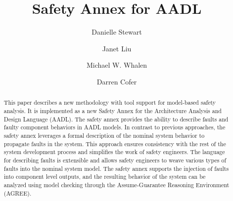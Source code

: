 \documentclass{llncs}
\begin{document}
\newcommand{\stateequiv}{\equiv_{s}}
\newcommand{\traceequiv}{\equiv_{\sigma}}
\newcommand{\ta}{\text{TA}}
\newcommand{\cta}{\text{TA$_{C}$}}
\newcommand{\tta}{\text{TA$_{T}$}}
\newcommand{\ucalg}{\texttt{\small{IVC\_UC}}}
\newcommand{\ucbfalg}{\texttt{\small{IVC\_UCBF}}}


\title{Safety Annex for AADL}
%
\author{Danielle Stewart
\and Janet Liu
\and Michael W. Whalen
\and Darren Cofer }
\maketitle

\begin{abstract}
This paper describes a new methodology with tool support for model-based safety analysis. It is implemented as a new Safety Annex for the Architecture Analysis and Design Language (AADL). The safety annex provides the ability to describe faults and faulty component behaviors in AADL models. In contrast to previous approaches, the safety annex leverages a formal description of the nominal system behavior to propagate faults in the system. This approach ensures consistency with the rest of the system development process and simplifies the work of safety engineers. The language for describing faults is extensible and allows safety engineers to weave various types of faults into the nominal system model. The safety annex supports the injection of faults into component level outputs, and the resulting behavior of the system can be analyzed using model checking through the Assume-Guarantee Reasoning Environment (AGREE).


\end{abstract}

\end{document}
